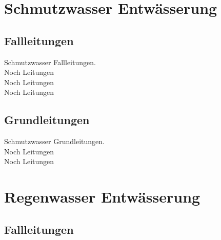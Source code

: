 \documentclass[12pt]{report}
\begin{document}
\chapter*{Schmutzwasser Entwässerung}
\section*{Fallleitungen}

Schmutzwasser Fallleitungen.\\
Noch Leitungen\\
Noch Leitungen\\
Noch Leitungen\\

\section*{Grundleitungen}

Schmutzwasser Grundleitungen.\\
Noch Leitungen\\
Noch Leitungen\\

\pagebreak

\chapter*{Regenwasser Entwässerung}
\section*{Fallleitungen}
\end{document}
